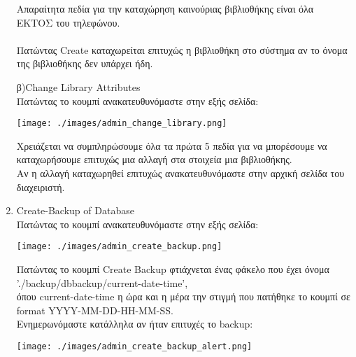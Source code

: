 \documentclass[14pt]{report}
\begin{document}
\begin{enumerate}
		Απαραίτητα πεδία για την καταχώρηση καινούριας βιβλιοθήκης είναι όλα ΕΚΤΟΣ του τηλεφώνου. \\ \\
		Πατώντας Create καταχωρείται επιτυχώς η βιβλιοθήκη στο σύστημα αν το όνομα της βιβλιοθήκης δεν υπάρχει ήδη.
		
		\newpage
		β)Change Library Attributes \\
		Πατώντας το κουμπί ανακατευθυνόμαστε στην εξής σελίδα: \\
		
		
		\vspace{\baselineskip}
		
		\texttt{[image: ./images/admin\_change\_library.png]}
		
		\vspace{\baselineskip}
		
		Χρειάζεται να συμπληρώσουμε όλα τα πρώτα 5 πεδία για να μπορέσουμε να καταχωρήσουμε επιτυχώς μια αλλαγή στα στοιχεία μια βιβλιοθήκης. \\
		Αν η αλλαγή καταχωρηθεί επιτυχώς ανακατευθυνόμαστε στην αρχική σελίδα του διαχειριστή. 
		
		\newpage
		\hypertarget{a-create-backup}{}
		\item Create-Backup of Database \\
		Πατώντας το κουμπί ανακατευθυνόμαστε στην εξής σελίδα: \\
		
		\vspace{\baselineskip}
		
		\texttt{[image: ./images/admin\_create\_backup.png]}
		
		\vspace{\baselineskip}
		
		Πατώντας το κουμπί  Create Backup φτιάχνεται ένας φάκελο που έχει όνομα './backup/dbbackup/current-date-time', \\
		όπου current-date-time η ώρα και η μέρα την στιγμή που πατήθηκε το κουμπί σε format YYYY-MM-DD-HH-MM-SS. \\
		
		Ενημερωνόμαστε κατάλληλα αν ήταν επιτυχές το backup: \\
		
		\vspace{\baselineskip}
		
		\texttt{[image: ./images/admin\_create\_backup\_alert.png]}
		
		\vspace{\baselineskip}
		

\end{enumerate}
\end{document}
